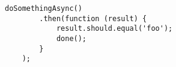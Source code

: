 
\begin{lstlisting}[basicstyle=\basicstyle]
	doSomethingAsync()
		.then(function (result) {
			result.should.equal('foo');
			done();
		}
	);
\end{lstlisting}
